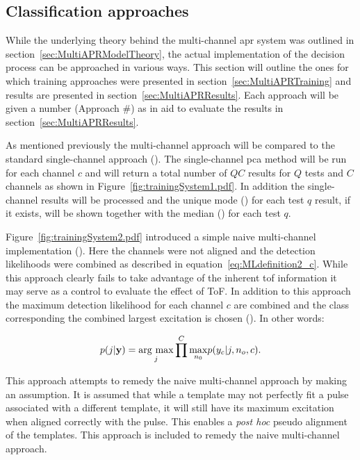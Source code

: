 \subsection{Classification approaches}
While the underlying theory behind the multi-channel \gls{apr} system was outlined in section~\ref{sec:MultiAPRModelTheory}, the actual implementation of the decision process can be approached in various ways. This section will outline the ones for which training approaches were presented in section~\ref{sec:MultiAPRTraining} and results are presented in section~\ref{sec:MultiAPRResults}. Each approach will be given a number (Approach \#) as in aid to evaluate the results in section~\ref{sec:MultiAPRResults}.

As mentioned previously the multi-channel approach will be compared to the standard single-channel approach (). The single-channel \gls{pca} method will be run for each channel $c$ and will return a total number of $QC$ results for $Q$ tests and $C$ channels as shown in Figure~\ref{fig:trainingSystem1.pdf}. In addition the single-channel results will be processed and the unique mode () for each test $q$ result, if it exists, will be shown together with the median () for each test $q$.

Figure~\ref{fig:trainingSystem2.pdf} introduced a simple naive multi-channel implementation (). Here the channels were not aligned and the detection likelihoods were combined as described in equation~\ref{eq:MLdefinition2_c}. While this approach clearly fails to take advantage of the inherent \gls{tof} information it may serve as a control to evaluate the effect of ToF. In addition to this approach the maximum detection likelihood for each channel $c$ are combined and the class corresponding the combined largest excitation is chosen (). In other words:

\begin{equation}\label{eq:jointprob3_c}
p(j|\textbf{y}) = \underset{j}{\mathrm{arg~max}} \prod^C \underset{n_0}{\max} p(y_c|j,n_o,c).
\end{equation}

This approach attempts to remedy the naive multi-channel approach by making an assumption. It is assumed that while a template may not perfectly fit a pulse associated with a different template, it will still have its maximum excitation when aligned correctly with the pulse. This enables a \emph{post hoc} pseudo alignment of the templates. This approach is included to remedy the naive multi-channel approach.

